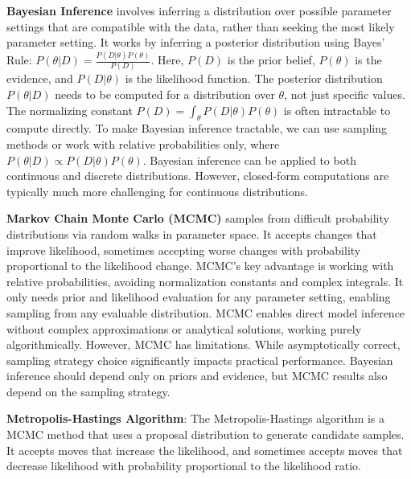 \documentclass{article}
\begin{document}

\textbf{Bayesian Inference} involves inferring a distribution over possible parameter settings that are compatible with the data, rather than seeking the most likely parameter setting.
It works by inferring a posterior distribution using Bayes' Rule: $P(\theta|D) = \frac{P(D|\theta)P(\theta)}{P(D)}$.
Here, $P(D)$ is the prior belief, $P(\theta)$ is the evidence, and $P(D|\theta)$ is the likelihood function.
The posterior distribution $P(\theta|D)$ needs to be computed for a distribution over $\theta$, not just specific values.
The normalizing constant $P(D) = \int_\theta P(D|\theta)P(\theta)$ is often intractable to compute directly.
To make Bayesian inference tractable, we can use sampling methods or work with relative probabilities only, where $P(\theta|D) \propto P(D|\theta)P(\theta)$.
Bayesian inference can be applied to both continuous and discrete distributions.
However, closed-form computations are typically much more challenging for continuous distributions.


\textbf{Markov Chain Monte Carlo (MCMC)} samples from difficult probability distributions via random walks in parameter space. It accepts changes that improve likelihood, sometimes accepting worse changes with probability proportional to the likelihood change.
MCMC's key advantage is working with relative probabilities, avoiding normalization constants and complex integrals. It only needs prior and likelihood evaluation for any parameter setting, enabling sampling from any evaluable distribution.
MCMC enables direct model inference without complex approximations or analytical solutions, working purely algorithmically.
However, MCMC has limitations. While asymptotically correct, sampling strategy choice significantly impacts practical performance. Bayesian inference should depend only on priors and evidence, but MCMC results also depend on the sampling strategy.



\textbf{Metropolis-Hastings Algorithm}:
The Metropolis-Hastings algorithm is a MCMC method that uses a proposal distribution to generate candidate samples.
It accepts moves that increase the likelihood, and sometimes accepts moves that decrease likelihood with probability
proportional to the likelihood ratio.

\end{document}
